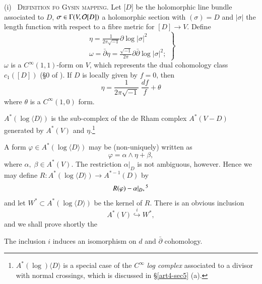 \medskip
\noindent
(i)~ \textsc{Definition fo Gysin mapping.} Let [$D$] be the holomorphic line bundle associated to $D$, $\sigma \in \Gamma (V, \mathcal{O}[D])$ a holomorphic section with $(\sigma) = D$ and $|\sigma|$ the length function with respect to a fibre metric for $[D] \to V$. Define
\begin{equation}
\left.
\begin{matrix}
\eta = \frac{1}{2\pi \sqrt{-1}} \partial \log |\sigma|^2 \\[0.2cm]
\omega = \bar{\partial} \eta = \frac{\sqrt{-1}}{2\pi} \partial \bar{\partial} \log |\sigma|^2 ; 
\end{matrix}
\right\}
\label{art4-eq2.15}
\end{equation}
$\omega$ is a $C^\infty(1,1)$-form on $V$, which represents the dual cohomology class $c_1 ([D])$ (\cf \S 0 of \cite{art4-key24}). If $D$ is locally given by $f =0$, then 
$$
\eta = \frac{1}{2 \pi \sqrt{-1}}  \; \frac{df}{f} + \theta
$$
where $\theta$ is a $C^\infty (1,0)$ form.

\begin{defi*}
$A^\ast (\log \langle D \rangle)$ is the sub-complex of the de Rham complex $A^\ast (V-D)$ generated by $A^\ast (V)$ and $\eta$.\footnote[4]{$A^\ast (\log) \langle D \rangle$ is a special case of the $C^\infty$ \textit{log complex} associated to a divisor with normal crossings, which is discussed in \S \ref{art4-sec5} (a).
}
\end{defi*}

A form $\varphi \in A^\ast (\log \langle D \rangle)$  may be (non-uniquely) written as 
\begin{equation}
\varphi = \alpha \wedge \eta + \beta, \label{art4-eq2.16}
\end{equation}
where $\alpha, \; \beta \in A^\ast (V)$. The restriction $\alpha |_{D}$ is not ambiguous, however. Hence we may define $R: A^\ast (\log \langle D \rangle) \to A^{\ast-1} (D)$ by
\begin{equation}
R (\varphi) - \alpha |_{D}, \footnotemark[5]{} 
\label{art4-eq2.17}
\end{equation}\pageoriginale
and let $W^\ast \subset A^\ast (\log \langle D \rangle)$ be the kernel of $R$. There is an obvious inclusion
$$
A^\ast (V) {\displaystyle{\mathop{\hookrightarrow}\limits^i}} W^\ast,
$$
and we shall prove shortly the 

\begin{proposition}\label{art4-prop2.18}
The inclusion $i$ induces an isomorphism on $d$ and $\bar{\partial}$ cohomology.
\end{proposition}

